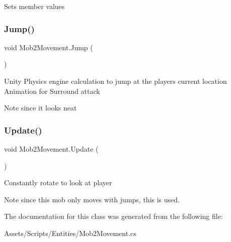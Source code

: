 Sets member values \mbox{\label{class_mob2_movement_aedc7ef856890634eafcb09ed1e6d0a5f}} 
\subsubsection{\texorpdfstring{Jump()}{Jump()}}
{\footnotesize\ttfamily void Mob2\+Movement.\+Jump (\begin{DoxyParamCaption}{ }\end{DoxyParamCaption})\hspace{0.3cm}{\ttfamily [private]}}

Unity Physics engine calculation to jump at the player\textquotesingle{}s current location Animation for Surround attack \begin{DoxyNote}{Note}
since it looks neat 
\end{DoxyNote}
\mbox{\label{class_mob2_movement_ad5700e3c04953999dc85ba86cbcf889d}} 
\subsubsection{\texorpdfstring{Update()}{Update()}}
{\footnotesize\ttfamily void Mob2\+Movement.\+Update (\begin{DoxyParamCaption}{ }\end{DoxyParamCaption})\hspace{0.3cm}{\ttfamily [private]}}

Constantly rotate to look at player \begin{DoxyNote}{Note}
since this mob only moves with jumps, this is used. 
\end{DoxyNote}


The documentation for this class was generated from the following file\+:\begin{DoxyCompactItemize}
\item 
Assets/\+Scripts/\+Entities/Mob2\+Movement.\+cs\end{DoxyCompactItemize}
